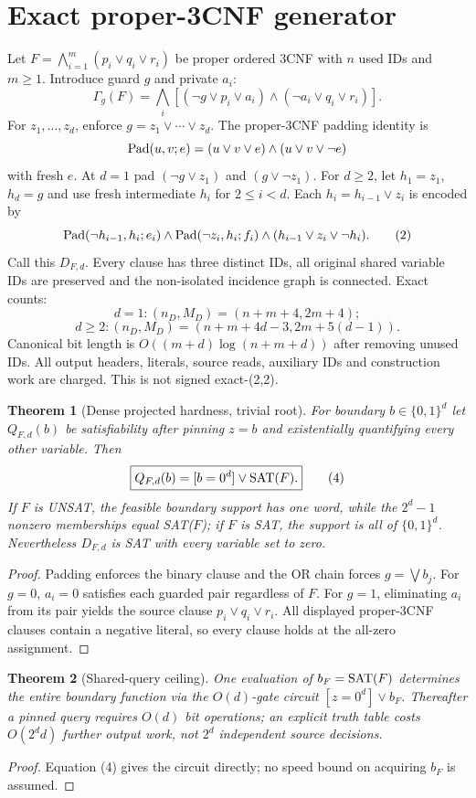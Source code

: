 \documentclass[11pt]{article}
\newtheorem{theorem}{Theorem}
\begin{document}
\section{Exact proper-3CNF generator}
Let $F=\bigwedge_{i=1}^{m}(p_i\vee q_i\vee r_i)$ be proper ordered 3CNF with $n$ used IDs and $m\ge1$. Introduce guard $g$ and private $a_i$:
\[
\Gamma_g(F)=\bigwedge_i[(\neg g\vee p_i\vee a_i)\wedge(\neg a_i\vee q_i\vee r_i)].\tag{1}
\]
For $z_1,\ldots,z_d$, enforce $g=z_1\vee\cdots\vee z_d$. The proper-3CNF padding identity is
\[
{\rm Pad}(u,v;e)=(u\vee v\vee e)\wedge(u\vee v\vee\neg e)
\]
with fresh $e$. At $d=1$ pad $(\neg g\vee z_1)$ and $(g\vee\neg z_1)$. For $d\ge2$, let $h_1=z_1$, $h_d=g$ and use fresh intermediate $h_i$ for $2\le i<d$. Each $h_i=h_{i-1}\vee z_i$ is encoded by
\[
{\rm Pad}(\neg h_{i-1},h_i;e_i)\wedge
{\rm Pad}(\neg z_i,h_i;f_i)\wedge(h_{i-1}\vee z_i\vee\neg h_i).\tag{2}
\]
Call this $D_{F,d}$. Every clause has three distinct IDs, all original shared variable IDs are preserved and the non-isolated incidence graph is connected. Exact counts:
\[
d=1:(n_D,M_D)=(n+m+4,2m+4);
\]
\[
d\ge2:(n_D,M_D)=(n+m+4d-3,2m+5(d-1)).\tag{3}
\]
Canonical bit length is $O((m+d)\log(n+m+d))$ after removing unused IDs. All output headers, literals, source reads, auxiliary IDs and construction work are charged. This is not signed exact-(2,2).
\begin{theorem}[Dense projected hardness, trivial root]
For boundary $b\in\{0,1\}^d$ let $Q_{F,d}(b)$ be satisfiability after pinning $z=b$ and existentially quantifying every other variable. Then
\[
\boxed{Q_{F,d}(b)=[b=0^d]\vee{\rm SAT}(F).}\tag{4}
\]
If $F$ is UNSAT, the feasible boundary support has one word, while the $2^d-1$ nonzero memberships equal SAT($F$); if $F$ is SAT, the support is all of $\{0,1\}^d$. Nevertheless $D_{F,d}$ is SAT with every variable set to zero.
\end{theorem}
\begin{proof}
Padding enforces the binary clause and the OR chain forces $g=\bigvee b_j$. For $g=0$, $a_i=0$ satisfies each guarded pair regardless of $F$. For $g=1$, eliminating $a_i$ from its pair yields the source clause $p_i\vee q_i\vee r_i$. All displayed proper-3CNF clauses contain a negative literal, so every clause holds at the all-zero assignment.
\end{proof}
\begin{theorem}[Shared-query ceiling]
One evaluation of $b_F={\rm SAT}(F)$ determines the entire boundary function via the $O(d)$-gate circuit $[z=0^d]\vee b_F$. Thereafter a pinned query requires $O(d)$ bit operations; an explicit truth table costs $O(2^d d)$ further output work, not $2^d$ independent source decisions.
\end{theorem}
\begin{proof}Equation (4) gives the circuit directly; no speed bound on acquiring $b_F$ is assumed.\end{proof}
\end{document}
